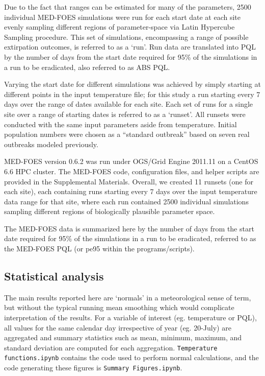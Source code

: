 \documentclass[10pt,a4paper,twocolumn]{article}
\begin{document}
Due to the fact that ranges can be estimated for many of the parameters,
2500 individual MED-FOES simulations were run for each start date at each site 
evenly sampling different regions of parameter-space via Latin Hypercube Sampling\cite{10.2307/1403510} procedure.
This set of simulations, encompassing a range of possible extirpation outcomes, is referred to as a `run'.
Run data are translated into PQL by the number of days from the start date required for
95\% of the simulations in a run to be eradicated, also referred to as ABS PQL.

Varying the start date for different simulations was achieved by simply 
starting at different points in the input temperature file; 
for this study a run starting every 7 days over the range of dates available for each site.
Each set of runs for a single site over a range of starting dates is referred to as a `runset'.
All runsets were conducted with the same input parameters aside from temperature.
Initial population numbers were chosen as a ``standard outbreak'' based on seven real 
outbreaks modeled previously\cite{manoukis_agent-based_2014}.

MED-FOES version 0.6.2 was run under OGS/Grid Engine 2011.11 on a CentOS 6.6 HPC cluster.
The MED-FOES code, configuration files, and helper scripts are provided in the Supplemental Materials.
Overall, we created 11 runsets (one for each site), 
each containing runs starting every 7 days over the input temperature data range for that site,
where each run contained 2500 individual simulations sampling different regions of 
biologically plausible parameter space.


The MED-FOES data is summarized here by the number of days from the start date required for
95\% of the simulations in a run to be eradicated, referred to as the MED-FOES PQL
(or pe95 within the programs/scripts).

\subsection*{Statistical analysis}

The main results reported here are `normals' in a meteorological sense of term,
but without the typical running mean smoothing which would complicate
interpretation of the results.
For a variable of interest (eg. temperature or PQL), 
all values for the same calendar day irrespective of year (eg. 20-July) are
aggregated and summary statistics such as mean, minimum, maximum, and standard deviation 
are computed for each aggregation.
\texttt{Temperature functions.ipynb} contains the code used to perform normal calculations, 
and the code generating these figures is \texttt{Summary Figures.ipynb}.
\end{document}
